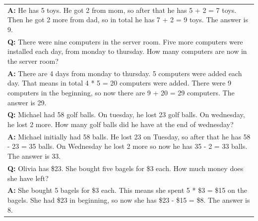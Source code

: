 \begin{table}[h]
\begin{tabular}{p{13.5cm}}
        \vspace{-1mm}
        \textbf{A:} He has 5 toys. He got 2 from mom, so after that he has 5 + 2 = 7 toys. Then he got 2 more from dad, so in total he has 7 + 2 = 9 toys. The answer is 9. \\
        \vspace{0mm}
        \textbf{Q:} There were nine computers in the server room. Five more computers were installed each day, from monday to thursday. How many computers are now in the server room? \\
        \vspace{-1mm}
        \textbf{A:} There are 4 days from monday to thursday. 5 computers were added each day. That means in total 4 * 5 = 20 computers were added. There were 9 computers in the beginning, so now there are 9 + 20 = 29 computers. The answer is 29. \\
        \vspace{0mm}
        \textbf{Q:} Michael had 58 golf balls. On tuesday, he lost 23 golf balls. On wednesday, he lost 2 more. How many golf balls did he have at the end of wednesday? \\
        \vspace{-1mm}
        \textbf{A:} Michael initially had 58 balls. He lost 23 on Tuesday, so after that he has 58 - 23 = 35 balls. On Wednesday he lost 2 more so now he has 35 - 2 = 33 balls. The answer is 33.\ \\
        \vspace{0mm}
        \textbf{Q:} Olivia has \$23. She bought five bagels for \$3 each. How much money does she have left? \\
        \vspace{-1mm}
        \textbf{A:} She bought 5 bagels for \$3 each. This means she spent 5 * \$3 = \$15 on the bagels. She had \$23 in beginning, so now she has \$23 - \$15 = \$8. The answer is 8. \\
        \bottomrule
    \end{tabular}
    \label{tab:prompt-math}
\end{table}


